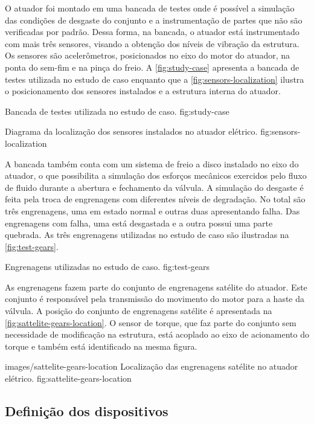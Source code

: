 O atuador foi montado em uma bancada de testes onde é possível a simulação das condições de desgaste
do conjunto e a instrumentação de partes que não são verificadas por padrão. Dessa forma, na
bancada, o atuador está instrumentado com mais três sensores, visando a obtenção dos níveis de
vibração da estrutura. Os sensores são acelerômetros, posicionados no eixo do motor do atuador, na
ponta do sem-fim e na pinça do freio. A \cref{fig:study-case} apresenta a bancada de testes
utilizada no estudo de caso enquanto que a \cref{fig:sensors-localization} ilustra o posicionamento
dos sensores instalados e a estrutura interna do atuador.


  {Bancada de testes utilizada no estudo de caso.}
  {fig:study-case}

  {Diagrama da localização dos sensores instalados no atuador elétrico.}
  {fig:sensors-localization}

A bancada também conta com um sistema de freio a disco instalado no eixo do atuador, o que
possibilita a simulação dos esforços mecânicos exercidos pelo fluxo de fluido durante a abertura e
fechamento da válvula. A simulação do desgaste é feita pela troca de engrenagens com diferentes
níveis de degradação. No total são três engrenagens, uma em estado normal e outras duas apresentando
falha. Das engrenagens com falha, uma está desgastada e a outra possui uma parte quebrada. As três
engrenagens utilizadas no estudo de caso são ilustradas na \cref{fig:test-gears}.

  {Engrenagens utilizadas no estudo de caso.}
  {fig:test-gears}

As engrenagens fazem parte do conjunto de engrenagens satélite do atuador. Este conjunto é
responsável pela transmissão do movimento do motor para a haste da válvula. A posição do conjunto de
engrenagens satélite é apresentada na \cref{fig:sattelite-gears-location}. O sensor de torque, que
faz parte do conjunto sem necessidade de modificação na estrutura, está acoplado ao eixo de
acionamento do torque e também está identificado na mesma figura.

  {images/sattelite-gears-location}
  {Localização das engrenagens satélite no atuador elétrico.}
  {fig:sattelite-gears-location}


\subsection{Definição dos dispositivos}


